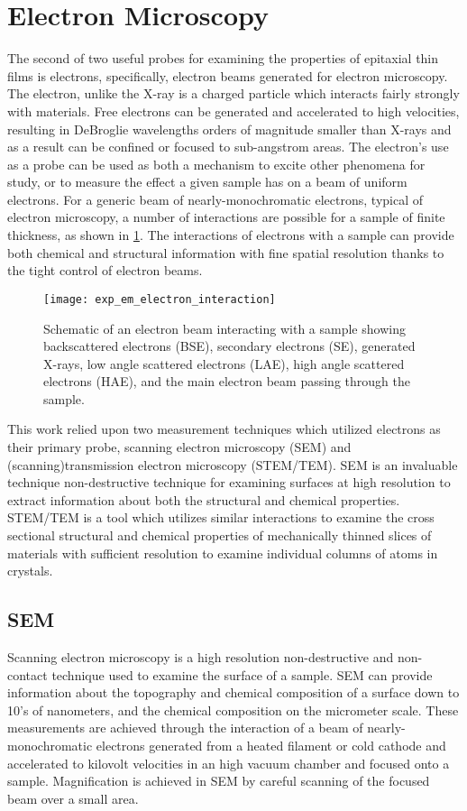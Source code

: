 \section{Electron Microscopy}
The second of two useful probes for examining the properties of epitaxial thin films is electrons, specifically, electron beams generated for electron microscopy.
The electron, unlike the X-ray is a charged particle which interacts fairly strongly with materials.
Free electrons can be generated and accelerated to high velocities, resulting in DeBroglie wavelengths orders of magnitude smaller than X-rays and as a result can be confined or focused to sub-angstrom areas.
The electron's use as a probe can be used as both a mechanism to excite other phenomena for study, or to measure the effect a given sample has on a beam of uniform electrons.
For a generic beam of nearly-monochromatic electrons, typical of electron microscopy, a number of interactions are possible for a sample of finite thickness, as shown in \cref{fig:exp_em_electron_interaction}.
The interactions of electrons with a sample can provide both chemical and structural information with fine spatial resolution thanks to the tight control of electron beams.
\begin{figure}
 \centering \texttt{[image: exp\_em\_electron\_interaction]}
 \caption[Electron interactions with materials]{\label{fig:exp_em_electron_interaction}Schematic of an electron beam interacting with a sample showing backscattered electrons (BSE), secondary electrons (SE), generated X-rays, low angle scattered electrons (LAE), high angle scattered electrons (HAE), and the main electron beam passing through the sample.}
\end{figure}

This work relied upon two measurement techniques which utilized electrons as their primary probe, scanning electron microscopy (SEM) and (scanning)transmission electron microscopy (STEM/TEM).
SEM is an invaluable technique non-destructive technique for examining surfaces at high resolution to extract information about both the structural and chemical properties.
STEM/TEM is a tool which utilizes similar interactions to examine the cross sectional structural and chemical properties of mechanically thinned slices of materials with sufficient resolution to examine individual columns of atoms in crystals.
\subsection{SEM} Scanning electron microscopy is a high resolution non-destructive and non-contact technique used to examine the surface of a sample.
SEM can provide information about the topography and chemical composition of a surface down to 10's of nanometers, and the chemical composition on the micrometer scale.
These measurements are achieved through the interaction of a beam of nearly-monochromatic electrons generated from a heated filament or cold cathode and accelerated to kilovolt velocities in an high vacuum chamber and focused onto a sample.
Magnification is achieved in SEM by careful scanning of the focused beam over a small area.

